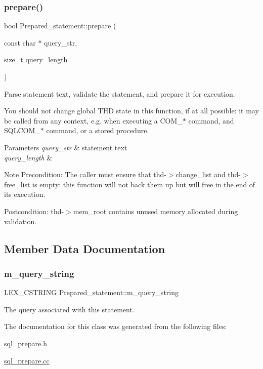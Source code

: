 \subsubsection{\texorpdfstring{prepare()}{prepare()}}
{\footnotesize\ttfamily bool Prepared\+\_\+statement\+::prepare (\begin{DoxyParamCaption}\item[{const char $\ast$}]{query\+\_\+str,  }\item[{size\+\_\+t}]{query\+\_\+length }\end{DoxyParamCaption})}

Parse statement text, validate the statement, and prepare it for execution.

You should not change global T\+HD state in this function, if at all possible\+: it may be called from any context, e.\+g. when executing a C\+O\+M\+\_\+$\ast$ command, and S\+Q\+L\+C\+O\+M\+\_\+$\ast$ command, or a stored procedure.


\begin{DoxyParams}{Parameters}
{\em query\+\_\+str} & statement text \\
\hline
{\em query\+\_\+length} & \\
\hline
\end{DoxyParams}
\begin{DoxyNote}{Note}
Precondition\+: The caller must ensure that thd-\/$>$change\+\_\+list and thd-\/$>$free\+\_\+list is empty\+: this function will not back them up but will free in the end of its execution.

Postcondition\+: thd-\/$>$mem\+\_\+root contains unused memory allocated during validation. 
\end{DoxyNote}


\subsection{Member Data Documentation}
\mbox{\label{classPrepared__statement_a1dd19fad322528df92ab374a076e3bf8}} 
\subsubsection{\texorpdfstring{m\+\_\+query\+\_\+string}{m\_query\_string}}
{\footnotesize\ttfamily L\+E\+X\+\_\+\+C\+S\+T\+R\+I\+NG Prepared\+\_\+statement\+::m\+\_\+query\+\_\+string}

The query associated with this statement. 

The documentation for this class was generated from the following files\+:\begin{DoxyCompactItemize}
\item 
sql\+\_\+prepare.\+h\item 
\mbox{\hyperlink{sql__prepare_8cc}{sql\+\_\+prepare.\+cc}}\end{DoxyCompactItemize}
